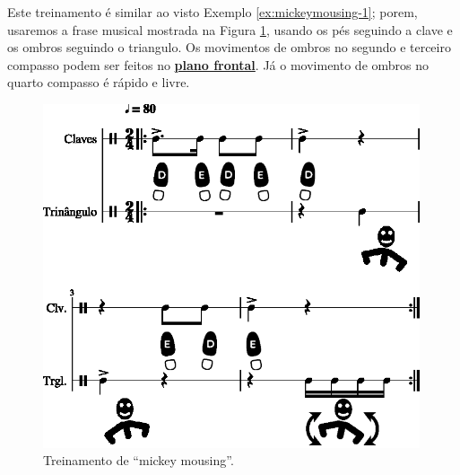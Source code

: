 \begin{example}
\label{ex:mickeymousing-2}
Este treinamento é similar ao visto Exemplo \ref{ex:mickeymousing-1};
porem, 
usaremos a frase musical mostrada na Figura \ref{fig:mickey-mousing-2-1}, 
usando os pés seguindo a clave e os ombros seguindo o triangulo.
Os movimentos de ombros no segundo e terceiro compasso
podem ser feitos no \hyperref[def:PlanoFrontal]{\textbf{plano frontal}}.
Já o movimento de ombros no quarto compasso é rápido e livre. 
\end{example}
\begin{figure}[h!]
    \centering
    \includegraphics[width=0.99\textwidth]{chapters/cap-musicalidade-tecnica/mickey-mousing-2-1.eps}
    \caption{Treinamento de ``mickey mousing''.}
    \label{fig:mickey-mousing-2-1}
\end{figure}


